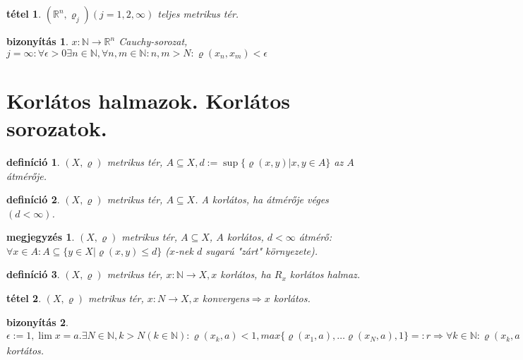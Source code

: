\documentclass{article}
\newcommand{\R}{\mathbb{R}}
\newcommand{\N}{\mathbb{N}}
\newcommand{\n}{\rightarrow}
\newcommand{\nn}{\Rightarrow}
\theoremstyle{magyar}
\newtheorem{de}{definíció}[section]
\newtheorem{te}{tétel}[section]
\newtheorem{bi}{bizonyítás}[section]
\newtheorem{me}{megjegyzés}[section]
\begin{document}
\begin{te}
  $(\R^n,\varrho_j)(j=1,2,\infty)$ teljes metrikus tér.
\end{te}
\begin{bi}
  $x:\N\n\R^n$ Cauchy-sorozat, $j=\infty: \forall\epsilon>0 \exists n\in\N, \forall n,m\in\N:n,m>N:\varrho(x_n,x_m)<\epsilon$
\end{bi}
\section{Korlátos halmazok. Korlátos sorozatok.}
\begin{de}
  $(X,\varrho)$ metrikus tér, $A\subseteq X,d:=\sup\{\varrho(x,y)|x,y\in A\}$ az $A$ átmérője.
\end{de}
\begin{de}
  $(X,\varrho)$ metrikus tér, $A\subseteq X$. A korlátos, ha átmérője véges$(d<\infty)$.
\end{de}
\begin{me}
  $(X,\varrho)$ metrikus tér, $A\subseteq X$, $A$ korlátos, $d<\infty$ átmérő:$\forall x\in A:A\subseteq\{y\in X| \varrho(x,y)\le d\}$ ($x$-nek $d$ sugarú "zárt" környezete).
\end{me}
\begin{de}
  $(X,\varrho)$ metrikus tér, $x:\N\n X,x$ korlátos, ha $R_x$ korlátos halmaz.
\end{de}
\begin{te}
  $(X,\varrho)$ metrikus tér, $x:N\n X,x$ konvergens$\nn x$ korlátos.
\end{te}
\begin{bi}
  $\epsilon:=1, \lim{x}=a.\exists N\in\N, k>N(k\in\N):\varrho(x_k,a)<1, max\{\varrho(x_1,a),\ldots\varrho(x_N,a),1\}=:r\nn\forall k\in\N:\varrho(x_k,a)\le r\nn\varrho(x_k,x_j)(\forall k,j\in N)\le2r\nn R_x$ kortátos.
  \end{bi}
\end{document}
